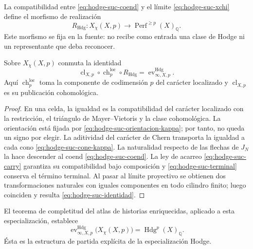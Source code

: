 La compatibilidad entre \eqref{eq:hodge-suc-coend} y el límite
\eqref{eq:hodge-suc-xchi} define el morfismo de realización
\begin{equation}\label{eq:hodge-suc-realizacion}
 R_{\mathrm{Hdg}}:
 X_{\chi}(X,p)\longrightarrow
 \operatorname{Perf}^{\geq p}(X)_{\mathbb Q}.
\end{equation}
Este morfismo se fija en la fuente: no recibe como entrada una clase de
Hodge ni un representante que deba reconocer.

\begin{theorem}
\label{thm:hodge-suc-identidad}
Sobre \(X_{\chi}(X,p)\) conmuta la identidad
\begin{equation}\label{eq:hodge-suc-identidad}
 \operatorname{cl}_{X,p}\circ
 \operatorname{ch}^{\mathrm{loc}}_{p}\circ
 R_{\mathrm{Hdg}}
 =\operatorname{ev}^{\mathrm{Hdg}}_{\infty,X,p}.
\end{equation}
Aquí
\(\operatorname{ch}^{\mathrm{loc}}_{p}\) toma la componente de
codimensión \(p\) del carácter localizado y
\(\operatorname{cl}_{X,p}\) es su publicación cohomológica.
\end{theorem}

\begin{proof}
En una celda, la igualdad es la compatibilidad del carácter localizado con
la restricción, el triángulo de Mayer--Vietoris y la clase cohomológica. La
orientación está fijada por \eqref{eq:hodge-suc-orientacion-kappa}; por
tanto, no queda un signo por elegir. La aditividad del carácter de Chern
transporta la igualdad a cada cono \eqref{eq:hodge-suc-cone-kappa}. La
naturalidad respecto de las flechas de \(J_N\) la hace descender al coend
\eqref{eq:hodge-suc-coend}. La ley de acarreo
\eqref{eq:hodge-suc-carry} garantiza su compatibilidad bajo composición y
\eqref{eq:hodge-suc-terminal} conserva el término terminal. Al pasar al
límite proyectivo se obtienen dos transformaciones naturales con iguales
componentes en todo cilindro finito; luego coinciden y resulta
\eqref{eq:hodge-suc-identidad}.
\end{proof}

El teorema de completitud del atlas de historias enriquecidas, aplicado a
esta especialización, establece
\begin{equation}\label{eq:hodge-suc-completitud}
 \operatorname{ev}^{\mathrm{Hdg}}_{\infty,X,p}
 \bigl(X_{\chi}(X,p)\bigr)
 =\operatorname{Hdg}^{p}(X)_{\mathbb Q}.
\end{equation}
Ésta es la estructura de partida explícita de la especialización Hodge.

